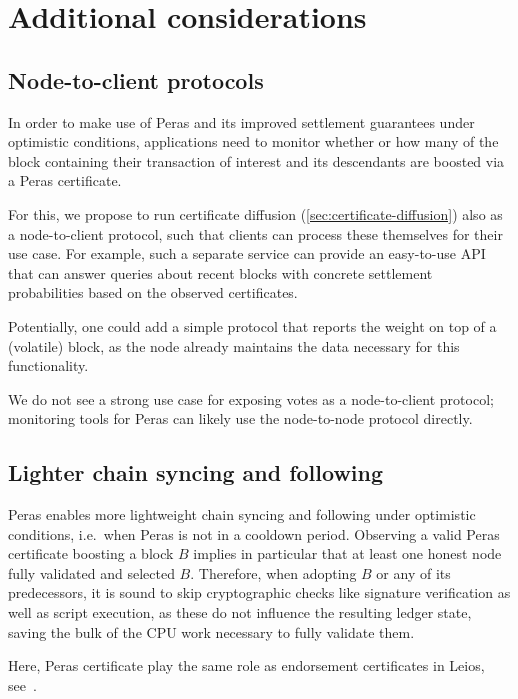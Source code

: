 \section{Additional considerations}

\subsection{Node-to-client protocols}

In order to make use of Peras and its improved settlement guarantees under optimistic conditions, applications need to monitor whether or how many of the block containing their transaction of interest and its descendants are boosted via a Peras certificate.

For this, we propose to run certificate diffusion (\cref{sec:certificate-diffusion}) also as a node-to-client protocol, such that clients can process these themselves for their use case.
For example, such a separate service can provide an easy-to-use API that can answer queries about recent blocks with concrete settlement probabilities based on the observed certificates.

Potentially, one could add a simple protocol that reports the weight on top of a (volatile) block, as the node already maintains the data necessary for this functionality.

We do not see a strong use case for exposing votes as a node-to-client protocol; monitoring tools for Peras can likely use the node-to-node protocol directly.

\subsection{Lighter chain syncing and following}

Peras enables more lightweight chain syncing and following under optimistic conditions, i.e.\ when Peras is not in a cooldown period.
Observing a valid Peras certificate boosting a block $B$ implies in particular that at least one honest node fully validated and selected $B$.
Therefore, when adopting $B$ or any of its predecessors, it is sound to skip cryptographic checks like signature verification as well as script execution, as these do not influence the resulting ledger state, saving the bulk of the CPU work necessary to fully validate them.

Here, Peras certificate play the same role as endorsement certificates in Leios, see~\cite[Section 4.4.2]{leios-design-goals-concepts}.

